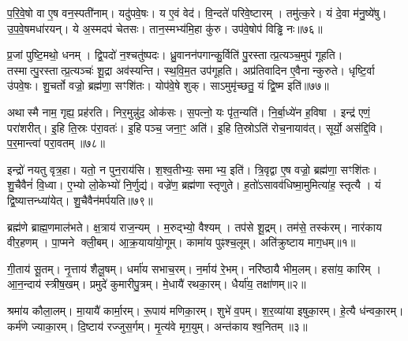 प॒रि॒वे॒षो वा ए॒ष वन॒स्पती॑नाम्।
यदु॑पवे॒षः।
य ए॒वं वेद॑।
वि॒न्दते॑ परिवे॒ष्टारम्।
तमु॑त्क॒रे।
यं दे॒वा म॑नु॒ष्ये॑षु।
उ॒प॒वे॒षमधा॑रयन्।
ये अ॒स्मदप॑ चेतसः।
तान॒स्मभ्य॑मि॒हा कु॑रु।
उप॑वे॒षोप॑ विड्ढि नः॥७६॥

प्र॒जां पुष्टि॒मथो॒ धनम्।
द्वि॒पदो॑ न॒श्चतु॑ष्पदः।
ध्रु॒वानन॑पगान्कु॒र्विति॑ पु॒रस्तात्प्र॒त्यञ्च॒मुप॑ गूहति।
तस्मात्पु॒रस्तात्प्र॒त्यञ्चः॑ शू॒द्रा अव॑स्यन्ति।
स्थ॒वि॒म॒त उप॑गूहति।
अप्र॑तिवादिन ए॒वैनान्कुरुते।
धृष्टि॒र्वा उ॑पवे॒षः।
शु॒चर्तो वज्रो॒ ब्रह्म॑णा॒ सꣳशि॑तः।
योप॑वे॒षे शुक्।
साऽमुमृ॑च्छतु॒ यं द्वि॒ष्म इति॑॥७७॥

अथास्मै नाम॒ गृह्य॒ प्रह॑रति।
निर॒मुन्नु॑द॒ ओक॑सः।
स॒पत्नो॒ यः पृ॑त॒न्यति॑।
नि॒र्बा॒ध्ये॑न ह॒विषा।
इन्द्र॑ एणं॒ परा॑शरीत्।
इ॒हि ति॒स्रः प॑रा॒वतः॑।
इ॒हि पञ्च॒ जना॒ꣳ॒ अति॑।
इ॒हि ति॒स्रोऽति॑ रोच॒नायाव॑त्।
सूर्यो॒ अस॑द्दि॒वि।
प॒र॒मान्त्वा॑ परा॒वतम्॥७८॥

इन्द्रो॑ नयतु वृत्र॒हा।
यतो॒ न पुन॒राय॑सि।
श॒श्व॒तीभ्यः॒ समाभ्य॒ इति॑।
त्रि॒वृद्वा ए॒ष वज्रो॒ ब्रह्म॑णा॒ सꣳशि॑तः।
शु॒चैवैनं॑ वि॒ध्वा।
ए॒भ्यो लो॒केभ्यो॑ नि॒र्णुद्य॑।
वज्रे॑ण॒ ब्रह्म॑णा स्तृणुते।
ह॒तो॑\-ऽसावव॑धिष्मा॒मुमित्या॑ह॒ स्तृत्यै।
यं द्वि॒ष्यात्तन्ध्या॑येत्।
शु॒चैवैन॑मर्पयति॥७९॥




\clearpage
{}
\setcounter{anuvakam}{0}

ब्रह्म॑णे ब्राह्म॒णमाल॑भते।
क्ष॒त्राय॑ राज॒न्यम्।
म॒रुद्भ्यो॒ वैश्यम्।
तप॑से शू॒द्रम्।
तम॑से॒ तस्क॑रम्।
नार॑काय वीर॒हणम्।
पा॒प्मने क्ली॒बम्।
आ॒क्र॒याया॑यो॒गूम्।
कामा॑य पुꣴश्च॒लूम्।
अति॑क्रुष्टाय माग॒धम्॥१॥

गी॒ताय॑ सू॒तम्।
नृ॒त्ताय॑ शैलू॒षम्।
धर्मा॑य सभाच॒रम्।
न॒र्माय॑ रे॒भम्।
नरि॑ष्ठायै भीम॒लम्।
हसा॑य॒ कारिम्।
आ॒न॒न्दाय॑ स्त्रीष॒खम्।
प्रमुदे॑ कुमारीपु॒त्रम्।
मे॒धायै॑ रथका॒रम्।
धैर्या॑य॒ तक्षा॑णम्॥२॥

श्रमा॑य कौला॒लम्।
मा॒यायै॑ कार्मा॒रम्।
रू॒पाय॑ मणिका॒रम्।
शुभे॑ व॒पम्।
श॒र॒व्या॑या इषुका॒रम्।
हे॒त्यै ध॑न्वका॒रम्।
कर्म॑णे ज्याका॒रम्।
दि॒ष्टाय॑ रज्जुस॒र्गम्।
मृ॒त्य॑वे मृग॒युम्।
अन्त॑काय श्व॒नितम्॥३॥

